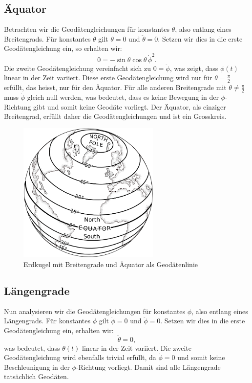 \subsection{Äquator}
Betrachten wir die Geodätengleichungen für konstantes $\theta$, also entlang eines Breitengrads.
Für konstantes $\theta$ gilt $\dot{\theta} = 0$ und $\ddot{\theta} = 0$.
Setzen wir dies in die erste Geodätengleichung ein, so erhalten wir:
\begin{equation}
	0 = -\sin\theta \cos\theta \, \dot{\phi}^2.
\end{equation}
Die zweite Geodätengleichung vereinfacht sich zu $0 = \ddot{\phi}$, was zeigt, dass $\phi(t)$ linear in der Zeit variiert.
Diese erste Geodätengleichung wird nur für $\theta = \frac{\pi}{2}$ erfüllt, das heisst, nur für den Äquator.
Für alle anderen Breitengrade mit $\theta \neq \frac{\pi}{2}$ muss $\dot{\phi}$ gleich null werden, was bedeutet, dass es keine Bewegung in der $\phi$-Richtung gibt und somit keine Geodäte vorliegt.
Der Äquator, als einziger Breitengrad, erfüllt daher die Geodätengleichungen und ist ein Grosskreis.

\begin{figure}
	\centering
	\includegraphics[width=7cm]{papers/geodaeten/Abbildungen/Standardverfahren/StaKugelBreitengrade}
	\caption{Erdkugel mit Breitengrade und Äquator als Geodätenlinie}
	\label{geodaeten:figure:Standardverfahren:Breitengrade}
\end{figure}

\subsection{Längengrade}
Nun analysieren wir die Geodätengleichungen für konstantes $\phi$, also entlang eines Längengrads.
Für konstantes $\phi$ gilt $\dot{\phi} = 0$ und $\ddot{\phi} = 0$.
Setzen wir dies in die erste Geodätengleichung ein, erhalten wir:
\begin{equation}
	\ddot{\theta} = 0,
\end{equation}
was bedeutet, dass $\theta(t)$ linear in der Zeit variiert.
Die zweite Geodätengleichung wird ebenfalls trivial erfüllt, da $\dot{\phi} = 0$ und somit keine Beschleunigung in der $\phi$-Richtung vorliegt.
Damit sind alle Längengrade tatsächlich Geodäten.

